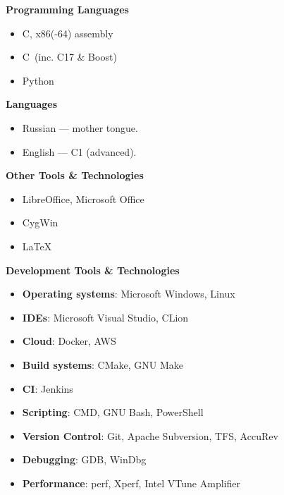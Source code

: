 \documentclass[11pt]{article}
\newcommand\CXX{C\nolinebreak[4]\hspace{-.05em}\raisebox{.4ex}{\relsize{-3}{\textbf{++}}}}
\newcommand\CvSmallSkipLength{0.5em}
\newcommand\CvBigSkipLength{1em}
\newcommand\CvSkip[1]{\vspace{#1}}
\newcommand\CvSmallSkip{\CvSkip{\CvSmallSkipLength}}
\newcommand\CvBigSkip{\CvSkip{\CvBigSkipLength}}
\newcommand\CvSectionHeader[1]{\CvBigSkip\textbf{#1}\CvBigSkip}
\newcommand\CvRule{\begingroup\color{CvRuleColor}\hrule\endgroup}
\newenvironment{CvWorkplaceDescription}{%
    \begingroup\setlength\parskip{\CvSmallSkipLength}%
  }{%
    \CvSmallSkip\endgroup%
  }
\begin{document}

\begin{minipage}[t]{.5\linewidth}
  \CvSectionHeader{Programming Languages}

  \begin{itemize}
    \item C, x86(-64) assembly
    \item \CXX\ (inc. {\CXX}17 \& Boost)
    \item Python
  \end{itemize}

  \CvSectionHeader{Languages}

  \begin{itemize}
    \item Russian --- mother tongue.
    \item English --- C1 (advanced).
  \end{itemize}

  \CvSectionHeader{Other Tools \& Technologies}

  \begin{itemize}
    \item LibreOffice, Microsoft Office
    \item CygWin
    \item \LaTeX
  \end{itemize}

\end{minipage}
\begin{minipage}[t]{.5\linewidth}
  \CvSectionHeader{Development Tools \& Technologies}

  \begin{itemize}
    \item \textbf{Operating systems}: Microsoft Windows, Linux
    \item \textbf{IDEs}: Microsoft Visual Studio, CLion
    \item \textbf{Cloud}: Docker, AWS
    \item \textbf{Build systems}: CMake, GNU Make
    \item \textbf{CI}: Jenkins
    \item \textbf{Scripting}: CMD, GNU Bash, PowerShell
    \item \textbf{Version Control}: Git, Apache Subversion, TFS, AccuRev
    \item \textbf{Debugging}: GDB, WinDbg
    \item \textbf{Performance}: perf, Xperf, Intel VTune Amplifier
  \end{itemize}
\end{minipage}
\end{document}
